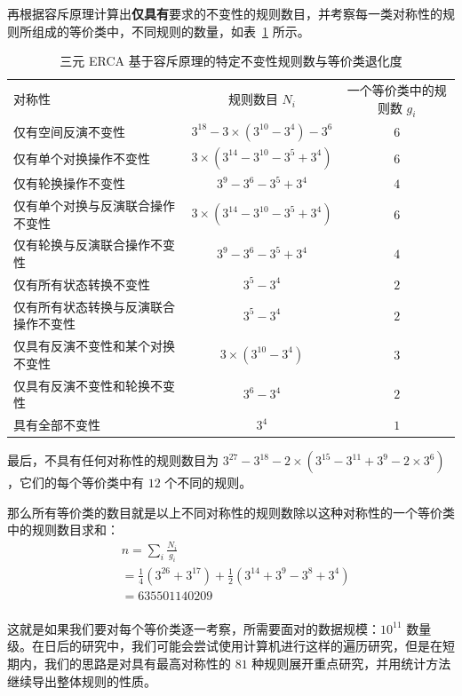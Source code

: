 \documentclass[reprint, amsmath, amssymb, aps, physrev,prb]{revtex4-2}
\begin{document}
再根据容斥原理计算出\textbf{仅具有}要求的不变性的规则数目，并考察每一类对称性的规则所组成的等价类中，不同规则的数量，如表~\ref{tab:ternary_equivalence} 所示。

\begin{table}[htbp]
\caption{\label{tab:ternary_equivalence} 三元 ERCA 基于容斥原理的特定不变性规则数与等价类退化度}
\begin{ruledtabular}
\begin{tabular}{lcc}
对称性 & 规则数目 $N_i$ & 一个等价类中的规则数 $g_i$ \\
\colrule
仅有空间反演不变性 & $3^{18}-3\times(3^{10}-3^4)-3^6$ & $6$ \\
仅有单个对换操作不变性 & $3\times(3^{14}-3^{10}-3^{5}+3^4)$ & $6$ \\
仅有轮换操作不变性 & $3^9-3^6-3^5+3^4$ & $4$ \\
仅有单个对换与反演联合操作不变性 & $3\times(3^{14}-3^{10}-3^{5}+3^4)$ & $6$ \\
仅有轮换与反演联合操作不变性 & $3^9-3^6-3^5+3^4$ & $4$ \\
仅有所有状态转换不变性 & $3^5-3^4$ & $2$ \\
仅有所有状态转换与反演联合操作不变性 & $3^5-3^4$ & $2$ \\
仅具有反演不变性和某个对换不变性 & $3\times(3^{10}-3^4)$ & $3$ \\
仅具有反演不变性和轮换不变性 & $3^6-3^4$ & $2$ \\
具有全部不变性 & $3^4$ & $1$ \\
\end{tabular}
\end{ruledtabular}
\end{table}

最后，不具有任何对称性的规则数目为 $3^{27}-3^{18}-2\times(3^{15}-3^{11}+3^9-2\times3^6)$，它们的每个等价类中有 $12$ 个不同的规则。

那么所有等价类的数目就是以上不同对称性的规则数除以这种对称性的一个等价类中的规则数目求和：
\begin{equation}
    \begin{aligned}
        & n = \sum_i \frac{N_i}{g_i}\\
        & = \frac14(3^{26}+3^{17})+\frac12(3^{14}+3^9-3^8+3^4)\\
        & = 635501140209\\
    \end{aligned}
\end{equation}

这就是如果我们要对每个等价类逐一考察，所需要面对的数据规模：$10^{11}$ 数量级。在日后的研究中，我们可能会尝试使用计算机进行这样的遍历研究，但是在短期内，我们的思路是对具有最高对称性的 $81$ 种规则展开重点研究，并用统计方法继续导出整体规则的性质。
\end{document}
